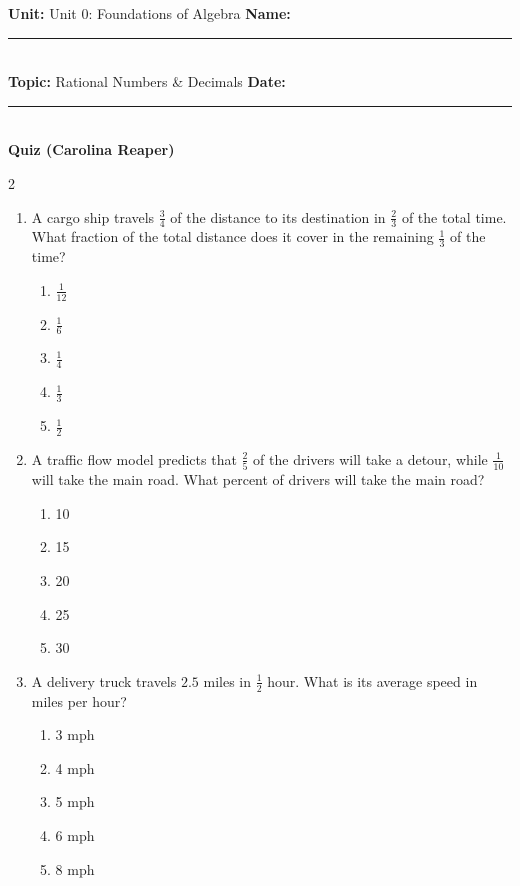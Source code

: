 \documentclass[10pt]{article}
\begin{document}
\enlargethispage{2.5cm}

\begin{tcolorbox}[colback=mainblue!5, colframe=mainblue, sharp corners, boxrule=0.5pt]
    \small \textbf{Unit:} Unit 0: Foundations of Algebra \hfill \textbf{Name:} \rule{3cm}{0.4pt} \\
    \small \textbf{Topic:} Rational Numbers & Decimals \hfill \textbf{Date:} \rule{2cm}{0.4pt} \\
    \centering \textbf{\large Quiz (Carolina Reaper)}
\end{tcolorbox}

\vspace{0.2cm}

\begin{multicols}{2}
\begin{enumerate}[label=\textbf{Q\arabic*.}, leftmargin=*, itemsep=6pt, parsep=0pt]

  \item \small A cargo ship travels $\frac{3}{4}$ of the distance to its destination in $\frac{2}{3}$ of the total time. What fraction of the total distance does it cover in the remaining $\frac{1}{3}$ of the time?
  \begin{enumerate}[label=(\Alph*), leftmargin=0.6cm, nosep, itemsep=2pt]
    \item $\frac{1}{12}$
    \item $\frac{1}{6}$
    \item $\frac{1}{4}$
    \item $\frac{1}{3}$
    \item $\frac{1}{2}$
  \end{enumerate}

  \item \small A traffic flow model predicts that $\frac{2}{5}$ of the drivers will take a detour, while $\frac{1}{10}$ will take the main road. What percent of drivers will take the main road?
  \begin{enumerate}[label=(\Alph*), leftmargin=0.6cm, nosep, itemsep=2pt]
    \item 10%
    \item 15%
    \item 20%
    \item 25%
    \item 30%
  \end{enumerate}

  \item \small A delivery truck travels $2.5$ miles in $\frac{1}{2}$ hour. What is its average speed in miles per hour?
  \begin{enumerate}[label=(\Alph*), leftmargin=0.6cm, nosep, itemsep=2pt]
    \item 3 mph
    \item 4 mph
    \item 5 mph
    \item 6 mph
    \item 8 mph
  \end{enumerate}


\end{enumerate}
\end{multicols}
\end{document}
